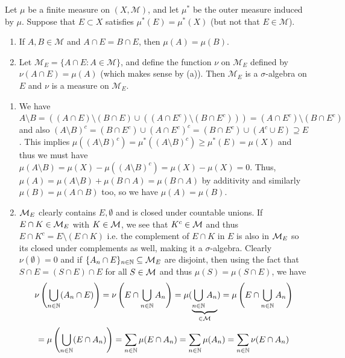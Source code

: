 \documentclass[12pt,a4paper]{article}
\begin{document}
\begin{problem}\label{prob:1-24}
Let $\mu$ be a finite measure on $(X, \mathcal{M})$, and let $\mu^*$ be the outer measure induced by $\mu$. Suppose that $E \subset X$ satisfies $\mu^*(E) = \mu^*(X)$ (but not that $E \in \mathcal{M}$).
\begin{enumerate}[label=\alph*.]
    \item If $A, B \in \mathcal{M}$ and $A \cap E = B \cap E$, then $\mu(A) = \mu(B)$.
    \item Let $\mathcal{M}_E = \{A \cap E : A \in \mathcal{M}\}$, and define the function $\nu$ on $\mathcal{M}_E$ defined by $\nu(A \cap E) = \mu(A)$ (which makes sense by (a)). Then $\mathcal{M}_E$ is a $\sigma$-algebra on $E$ and $\nu$ is a measure on $\mathcal{M}_E$.
\end{enumerate}
\end{problem}
\begin{solution}
    \begin{enumerate}[label=\alph*.]
        \item We have $A\setminus B=((A\cap E)\setminus(B\cap E)\cup((A\cap E^c)\setminus(B\cap E^c)))=(A\cap E^c)\setminus(B\cap E^c)$ and also $(A\setminus B)^c=(B\cap E^c)\cup(A\cap E^c)^c=(B\cap E^c)\cup(A^c\cup E)\supseteq E$.
        This implies $\mu((A\setminus B)^c)=\mu^*((A\setminus B)^c)\geq\mu^*(E)=\mu(X)$ and thus we must have $\mu(A\setminus B)=\mu(X)-\mu((A\setminus B)^c)=\mu(X)-\mu(X)=0.$
        Thus, $\mu(A)=\mu(A\setminus B)+\mu(B\cap A)=\mu(B\cap A)$ by additivity and similarly $\mu(B)=\mu(A\cap B)$ too, so we have $\mu(A)=\mu(B)$.
        \item $\mathcal{M}_E$ clearly contains $E,\emptyset$ and is closed under countable unions.
        If $E\cap K\in\mathcal{M}_E$ with $K\in\mathcal{M}$, we see that $K^c\in\mathcal{M}$ and thus $E\cap K^c=E\setminus(E\cap K)$ i.e. the complement of $E\cap K$ in $E$ is also in $\mathcal{M}_E$ so its closed under complements as well, making it a $\sigma$-algebra.
        Clearly $\nu(\emptyset)=0$ and if $\{A_n\cap E\}_{n\in\mathbb{N}}\subseteq\mathcal{M}_E$ are disjoint, then using the fact that $S\cap E=(S\cap E)\cap E$ for all $S\in\mathcal{M}$ and thus $\mu(S)=\mu(S\cap E)$, we have
        $$\nu\left(\bigcup_{n\in\mathbb{N}}(A_n\cap E)\right)=\nu\left(E\cap\bigcup_{n\in\mathbb{N}}A_n\right)=\mu(\underbrace{\bigcup_{n\in\mathbb{N}} A_n}_{\in\mathcal{M}})=\mu\left(E\cap\bigcup_{n\in\mathbb{N}}A_n\right)$$
        $$=\mu\left(\bigcup_{n\in\mathbb{N}}(E\cap A_n)\right)=\sum_{n\in\mathbb{N}}\mu(E\cap A_n)=\sum_{n\in\mathbb{N}}\mu(A_n)=\sum_{n\in\mathbb{N}}\nu(E\cap A_n)$$
    \end{enumerate}
\end{solution}
\end{document}
